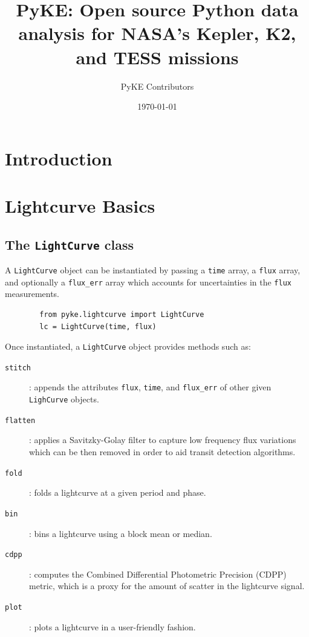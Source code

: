 \documentclass{article}
\title{PyKE: Open source Python data analysis for NASA's Kepler, K2, and TESS missions}
\author{PyKE Contributors}
\date{\today}
\begin{document}
\maketitle

\begin{abstract}

\end{abstract}

\section{Introduction}

\section{Lightcurve Basics}
    \subsection{The \texttt{LightCurve} class}
        A \texttt{LightCurve} object can be instantiated by passing a \texttt{time}
        array, a \texttt{flux} array, and optionally a \texttt{flux\_err} array which
        accounts for uncertainties in the \texttt{flux} measurements.
        \begin{verbatim}
        from pyke.lightcurve import LightCurve
        lc = LightCurve(time, flux)
        \end{verbatim}

        Once instantiated, a \texttt{LightCurve} object provides methods such
        as:
        \begin{description}
            \item[\texttt{stitch}]: appends the attributes \texttt{flux},
                \texttt{time}, and \texttt{flux\_err} of other given
                \texttt{LighCurve} objects.
            \item[\texttt{flatten}]: applies a Savitzky-Golay filter to capture
                low frequency flux variations which can be then removed in order
                to aid transit detection algorithms.
            \item[\texttt{fold}]: folds a lightcurve at a given period and
                phase.
            \item[\texttt{bin}]: bins a lightcurve using a block mean or median.
            \item[\texttt{cdpp}]: computes the Combined Differential Photometric
                Precision (CDPP) metric, which is a proxy for the amount of
                scatter in the lightcurve signal.
            \item[\texttt{plot}]: plots a lightcurve in a user-friendly fashion.
        \end{description}
\end{document}
